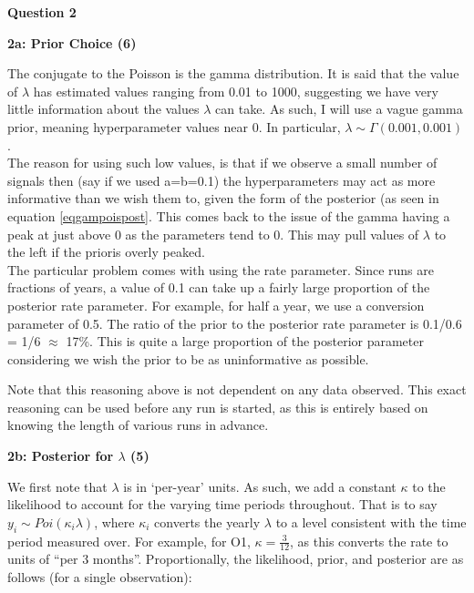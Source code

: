 \documentclass{article}
\begin{document}

\textbf{Question 2}

\textbf{2a: Prior Choice (6)}\label{sec:2a}

The conjugate to the Poisson is the gamma distribution. It is said that the value of $\lambda$ has estimated values ranging from 0.01 to 1000, suggesting we have very little information about the values $\lambda$ can take. As such, I will use a vague gamma prior, meaning hyperparameter values near 0. In particular, $\lambda \sim \Gamma(0.001, 0.001)$. \\

The reason for using such low values, is that if we observe a small number of signals then (say if we used a=b=0.1) the hyperparameters may act as more informative than we wish them to, given the form of the posterior (as seen in equation \eqref{eqgampoispost}. This comes back to the issue of the gamma having a peak at just above 0 as the parameters tend to 0. This may pull values of $\lambda$ to the left if the prioris overly peaked. \\

The particular problem comes with using the rate parameter. Since runs are fractions of years, a value of 0.1 can take up a fairly large proportion of the posterior rate parameter. For example, for half a year, we use a conversion parameter of 0.5. The ratio of the prior to the posterior rate parameter is 0.1/0.6 = 1/6 $\approx$ 17\%. This is quite a large proportion of the posterior parameter considering we wish the prior to be as uninformative as possible. 

Note that this reasoning above is not dependent on any data observed. This exact reasoning can be used before any run is started, as this is entirely based on knowing the length of various runs in advance. 

\textbf{2b: Posterior for $\lambda$ (5)} \label{sec:2b}

We first note that $\lambda$ is in `per-year' units. As such, we add a constant $\kappa$ to the likelihood to account for the varying time periods throughout. That is to say $y_i \sim Poi(\kappa_i \lambda)$, where $\kappa_i$ converts the yearly $\lambda$ to a level consistent with the time period measured over. For example, for O1, $\kappa = \frac{3}{12}$, as this converts the rate to units of  ``per 3 months''. Proportionally, the likelihood, prior, and posterior are as follows (for a single observation):
\end{document}
